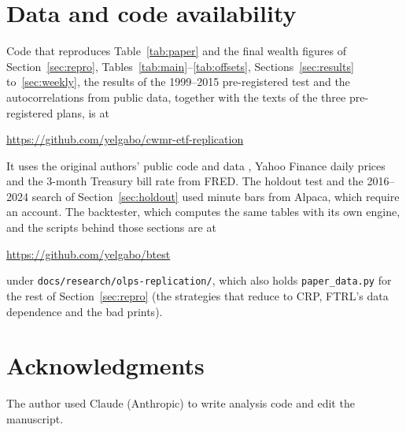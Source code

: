 \documentclass[11pt]{article}
\begin{document}
\section*{Data and code availability}

Code that reproduces Table~\ref{tab:paper} and the final wealth figures of
Section~\ref{sec:repro}, Tables~\ref{tab:main}--\ref{tab:offsets}, Sections~\ref{sec:results}
to~\ref{sec:weekly}, the results of the 1999--2015 pre-registered test and the autocorrelations
from public data,
together with the texts of the three pre-registered plans, is at
\begin{center}\url{https://github.com/yelgabo/cwmr-etf-replication}\end{center}
It uses the original authors' public code and data \citep{lahanis2025}, Yahoo Finance daily
prices and the 3-month Treasury bill rate from FRED. The holdout test and the 2016--2024 search
of Section~\ref{sec:holdout} used minute bars from Alpaca, which require an account. The
backtester, which computes the same tables with its own engine, and the scripts behind those
sections are at
\begin{center}\url{https://github.com/yelgabo/btest}\end{center}
under \texttt{docs/research/olps-replication/}, which also holds \texttt{paper\_data.py} for the
rest of Section~\ref{sec:repro} (the strategies that reduce to CRP, FTRL's data dependence and
the bad prints).

\section*{Acknowledgments}

The author used Claude (Anthropic) to write analysis code and edit the manuscript.



\end{document}
